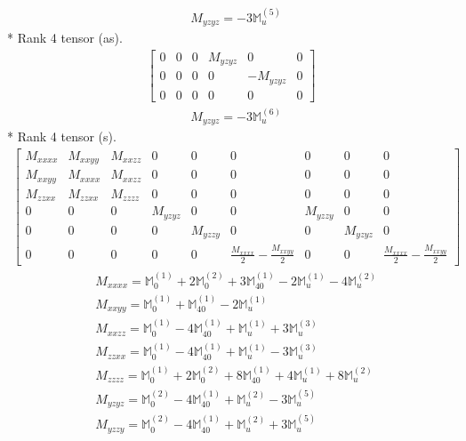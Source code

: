 \documentclass[fleqn,8pt,landscape]{jsarticle}
\begin{document}
\begin{align*}
& M_{yzyz} = - 3 \mathbb{M}_{u}^{(5)}
\end{align*}
* Rank 4 tensor (as).
\begin{align*}
\begin{bmatrix} 0 & 0 & 0 & M_{yzyz} & 0 & 0 \\ 0 & 0 & 0 & 0 & - M_{yzyz} & 0 \\ 0 & 0 & 0 & 0 & 0 & 0 \end{bmatrix}
\end{align*}
\begin{align*}
& M_{yzyz} = - 3 \mathbb{M}_{u}^{(6)}
\end{align*}
* Rank 4 tensor (s).
\begin{align*}
\begin{bmatrix} M_{xxxx} & M_{xxyy} & M_{xxzz} & 0 & 0 & 0 & 0 & 0 & 0 \\ M_{xxyy} & M_{xxxx} & M_{xxzz} & 0 & 0 & 0 & 0 & 0 & 0 \\ M_{zzxx} & M_{zzxx} & M_{zzzz} & 0 & 0 & 0 & 0 & 0 & 0 \\ 0 & 0 & 0 & M_{yzyz} & 0 & 0 & M_{yzzy} & 0 & 0 \\ 0 & 0 & 0 & 0 & M_{yzzy} & 0 & 0 & M_{yzyz} & 0 \\ 0 & 0 & 0 & 0 & 0 & \frac{M_{xxxx}}{2} - \frac{M_{xxyy}}{2} & 0 & 0 & \frac{M_{xxxx}}{2} - \frac{M_{xxyy}}{2} \end{bmatrix}
\end{align*}
\begin{align*}
& M_{xxxx} = \mathbb{M}_{0}^{(1)} + 2 \mathbb{M}_{0}^{(2)} + 3 \mathbb{M}_{40}^{(1)} - 2 \mathbb{M}_{u}^{(1)} - 4 \mathbb{M}_{u}^{(2)} \\
& M_{xxyy} = \mathbb{M}_{0}^{(1)} + \mathbb{M}_{40}^{(1)} - 2 \mathbb{M}_{u}^{(1)} \\
& M_{xxzz} = \mathbb{M}_{0}^{(1)} - 4 \mathbb{M}_{40}^{(1)} + \mathbb{M}_{u}^{(1)} + 3 \mathbb{M}_{u}^{(3)} \\
& M_{zzxx} = \mathbb{M}_{0}^{(1)} - 4 \mathbb{M}_{40}^{(1)} + \mathbb{M}_{u}^{(1)} - 3 \mathbb{M}_{u}^{(3)} \\
& M_{zzzz} = \mathbb{M}_{0}^{(1)} + 2 \mathbb{M}_{0}^{(2)} + 8 \mathbb{M}_{40}^{(1)} + 4 \mathbb{M}_{u}^{(1)} + 8 \mathbb{M}_{u}^{(2)} \\
& M_{yzyz} = \mathbb{M}_{0}^{(2)} - 4 \mathbb{M}_{40}^{(1)} + \mathbb{M}_{u}^{(2)} - 3 \mathbb{M}_{u}^{(5)} \\
& M_{yzzy} = \mathbb{M}_{0}^{(2)} - 4 \mathbb{M}_{40}^{(1)} + \mathbb{M}_{u}^{(2)} + 3 \mathbb{M}_{u}^{(5)}
\end{align*}
\end{document}
